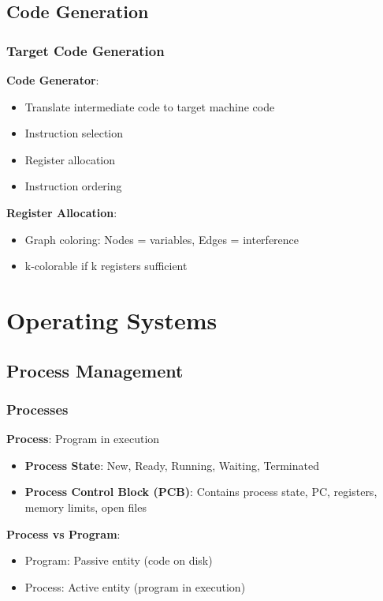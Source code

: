 \documentclass[12pt,a4paper]{report}
\begin{document}
\section{Code Generation}

\subsection{Target Code Generation}
\begin{concept}
\textbf{Code Generator}:
\begin{itemize}
    \item Translate intermediate code to target machine code
    \item Instruction selection
    \item Register allocation
    \item Instruction ordering
\end{itemize}

\textbf{Register Allocation}:
\begin{itemize}
    \item Graph coloring: Nodes = variables, Edges = interference
    \item k-colorable if k registers sufficient
\end{itemize}
\end{concept}

\chapter{Operating Systems}

\section{Process Management}

\subsection{Processes}
\begin{concept}
\textbf{Process}: Program in execution
\begin{itemize}
    \item \textbf{Process State}: New, Ready, Running, Waiting, Terminated
    \item \textbf{Process Control Block (PCB)}: Contains process state, PC, registers, memory limits, open files
\end{itemize}

\textbf{Process vs Program}:
\begin{itemize}
    \item Program: Passive entity (code on disk)
    \item Process: Active entity (program in execution)
\end{itemize}
\end{concept}
\end{document}
